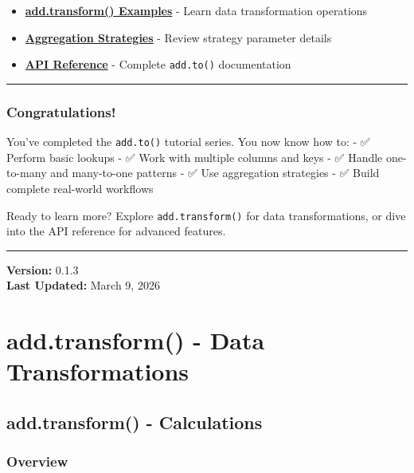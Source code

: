 \documentclass[
  letterpaper,
]{scrbook}
\providecommand{\tightlist}{%
  \setlength{\itemsep}{0pt}\setlength{\parskip}{0pt}}
\begin{document}
\begin{itemize}
\tightlist
\item
  \textbf{\href{examples-transform-01-calc.html}{add.transform()
  Examples}} - Learn data transformation operations
\item
  \textbf{\href{examples-to-04-strategy.html}{Aggregation Strategies}} -
  Review strategy parameter details
\item
  \textbf{\href{reference-to-basic.html}{API Reference}} - Complete
  \texttt{add.to()} documentation
\end{itemize}

\begin{center}\rule{0.5\linewidth}{0.5pt}\end{center}

\section{Congratulations!}\label{congratulations}

You've completed the \texttt{add.to()} tutorial series. You now know how
to: - ✅ Perform basic lookups - ✅ Work with multiple columns and keys
- ✅ Handle one-to-many and many-to-one patterns - ✅ Use aggregation
strategies - ✅ Build complete real-world workflows

Ready to learn more? Explore \texttt{add.transform()} for data
transformations, or dive into the API reference for advanced features.

\begin{center}\rule{0.5\linewidth}{0.5pt}\end{center}

\textbf{Version:} 0.1.3\\
\textbf{Last Updated:} March 9, 2026

\part{add.transform() - Data Transformations}

\chapter{add.transform() -
Calculations}\label{add.transform---calculations}

\section{Overview}\label{overview-5}
\end{document}
